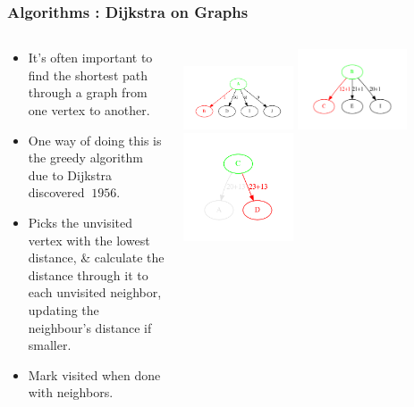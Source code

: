 \begin{frame}[fragile]
\frametitle{Algorithms : Dijkstra on Graphs}
\begin{columns}[T]

\begin{column}{0.45\textwidth}
\begin{itemize}[<+->]
\item It's often important to find the shortest path through a graph from one vertex to another.
\item One way of doing this is the greedy algorithm due to Dijkstra discovered $~1956$.
\item Picks the unvisited vertex with the lowest distance, \& calculate the distance through it to each unvisited neighbor, updating the neighbour's distance if smaller.
\item Mark visited when done with neighbors.
\end{itemize}
\end{column}

\begin{column}{0.45\textwidth}
\begin{center}
\pause
\includegraphics[width=0.4\textwidth]{../Images/dijkstra1.pdf}
\pause
\includegraphics[width=0.4\textwidth]{../Images/dijkstra2.pdf}
\pause
\includegraphics[width=0.4\textwidth]{../Images/dijkstra3.pdf}
\end{center}
\end{column}

\end{columns}
\end{frame}


